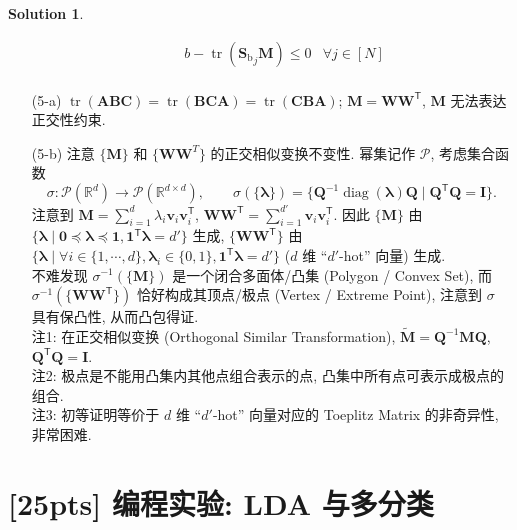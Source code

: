 \documentclass[a4paper]{article}
\numberwithin{equation}{section}
\theoremstyle{definition}
\newtheorem*{solution}{Solution}
\def \transposed {\mathsf{T}}
\def \Real {\mathbb{R}}
\def \lambdaBold {\bm{\lambda}}
\def \Sb {\mathbf{S}_{\operatorname{b}}}
\def \A {\mathbf{A}}
\def \B {\mathbf{B}}
\def \C {\mathbf{C}}
\def \Q {\mathbf{Q}}
\def \I {\mathbf{I}}
\def \M {\mathbf{M}}
\def \W {\mathbf{W}}
\def \v {\bm{v}}
\newcommand\sbr[1]{\left( #1 \right)}
\newcommand\tr[1]{\operatorname{tr}\sbr{#1}}
\begin{document}
\begin{solution}
\begin{itemize}
$$\begin{aligned}
                      \quad                     & b - \tr{{\Sb}_j \M} \leqslant 0                                     & \forall j \in [N]   \\
                  \end{aligned}
              $$
        \item[(5-a)] $\tr{\A\B\C} = \tr{\B\C\A} = \tr{\C\B\A}$; $\M = \W\W^\transposed$, $\M$ 无法表达正交性约束.
        \item[(5-b)] 注意 $\{\M\}$ 和 $\{\W\W^T\}$ 的正交相似变换不变性. 幂集记作 $\mathcal{P}$, 考虑集合函数
              $$\sigma: \mathcal{P}(\Real^{d}) \to \mathcal{P}(\Real^{d \times d}), \qquad \sigma(\{\lambdaBold\}) = \{\Q^{-1} \operatorname{diag}(\lambdaBold) \Q \mid \Q^\transposed \Q = \I\}.$$
              注意到 $\M = \sum_{i=1}^{d} \lambda_i \v_i \v_i^\transposed$, $\W\W^\transposed = \sum_{i=1}^{d'} \v_i \v_i^\transposed$. 因此 $\{\M\}$ 由 $\{\lambdaBold \mid \bm{0} \preccurlyeq \lambdaBold \preccurlyeq \bm{1}, \bm{1}^\transposed \lambdaBold = d'\}$ 生成, $\{\W\W^\transposed\}$ 由 $\{\lambdaBold \mid \forall i \in \{1, \cdots, d\}, \lambdaBold_i \in \{0, 1\}, \bm{1}^\transposed \lambdaBold = d'\}$ ($d$ 维 ``$d'$-hot'' 向量) 生成. \\
              不难发现 $\sigma^{-1}(\{\M\})$ 是一个闭合多面体/凸集 (Polygon / Convex Set), 而 $\sigma^{-1}(\{\W\W^\transposed\})$ 恰好构成其顶点/极点 (Vertex / Extreme Point), 注意到 $\sigma$ 具有保凸性, 从而凸包得证. \\
              \textsf{注1: 在正交相似变换 (Orthogonal Similar Transformation), $\tilde{\M} = \Q^{-1} \M \Q$, $\Q^\transposed \Q = \I$.} \\
              \textsf{注2: 极点是不能用凸集内其他点组合表示的点, 凸集中所有点可表示成极点的组合.} \\
              \textsf{注3: 初等证明等价于 $d$ 维 ``$d'$-hot'' 向量对应的 Toeplitz Matrix 的非奇异性, 非常困难.} \\
    \end{itemize}
\end{solution}


\newpage

\section{[25pts] 编程实验: LDA 与多分类}
\end{document}
